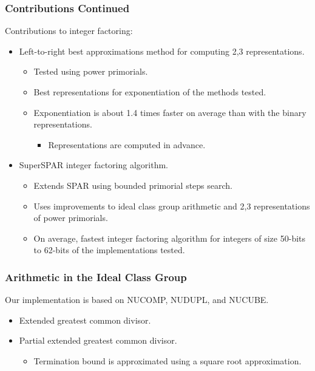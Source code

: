 \documentclass{beamer}
\begin{document}
\begin{frame}
\frametitle{Contributions Continued}
Contributions to integer factoring:

\begin{itemize}
\item Left-to-right best approximations method for computing 2,3 representations.
	\begin{itemize}
	\item Tested using power primorials.
	\item Best representations for exponentiation of the methods tested.
	\item Exponentiation is about 1.4 times faster on average than with the binary representations.
		\begin{itemize}
		\item Representations are computed in advance.
		\end{itemize}
	\end{itemize}
\item SuperSPAR integer factoring algorithm.
	\begin{itemize}
	\item Extends SPAR using bounded primorial steps search.
	\item Uses improvements to ideal class group arithmetic and 2,3 representations of power primorials.
	\item On average, fastest integer factoring algorithm for integers of size 50-bits to 62-bits of the implementations tested.
	\end{itemize}
\end{itemize}
\end{frame}
  
\begin{frame}
\frametitle{Arithmetic in the Ideal Class Group}
Our implementation is based on NUCOMP, NUDUPL, and NUCUBE. %

\begin{itemize}
\item Extended greatest common divisor.
\item Partial extended greatest common divisor.
	\begin{itemize}
	\item Termination bound is approximated using a square root approximation.
	\end{itemize}
\end{itemize}
\end{frame}  
\end{document}
